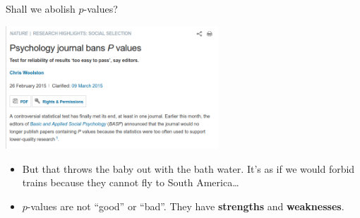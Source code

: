 \documentclass[
  10pt,
  ignorenonframetext,
]{beamer}
\providecommand{\tightlist}{%
  \setlength{\itemsep}{0pt}\setlength{\parskip}{0pt}}
\begin{document}
\begin{frame}
\begin{block}{Shall we abolish \(p\)-values?}
\protect\hypertarget{shall-we-abolish-p-values}{}
\(~\)

\centering

\includegraphics[width=0.6\textwidth,height=\textheight]{graphics/psycholog.png}

\flushleft
\vspace{6mm}

\begin{itemize}
\tightlist
\item
  But that throws the baby out with the bath water. It's as if we would
  forbid trains because they cannot fly to South America\ldots{}
\end{itemize}

\vspace{2mm}

\begin{itemize}
\tightlist
\item
  \(p\)-values are not ``good'' or ``bad''. They have \textbf{strengths}
  and \textbf{weaknesses}.
\end{itemize}
\end{block}
\end{frame}
\end{document}

